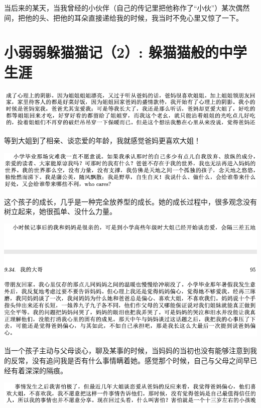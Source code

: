 \documentclass[9pt, b5paper]{article}
\begin{document}
当后来的某天，当我曾经的小伙伴（自己的传记里把他称作了“小伙”）某次偶然间，把他的头、把他的耳朵直接递给我的时候，我当时不免心里又惊了一下。

\section{小弱弱躲猫猫记（2）: 躲猫猫般的中学生涯}
\label{sec:orged57c9b}

\begin{center}
\includegraphics[width=.9\linewidth]{./pic/backups_plans_20210422_101254.png}
\end{center}

等到大姐到了相亲、谈恋爱的年龄，我就感觉爸妈更喜欢大姐！

\begin{center}
\includegraphics[width=.9\linewidth]{./pic/backups_plans_20210422_095031.png}
\end{center}

这个孩子的成长，几乎是一种完全放养型的成长。她的成长过程中，很多观念没有树立起来，她很孤单、没什么力量。 

\begin{center}
\includegraphics[width=.9\linewidth]{./pic/backups_plans_20210422_094911.png}
\end{center}

当一个孩子主动与父母谈心，聊及某事的时候，当妈妈的当初也没有能够注意到我的反常，没有追问我是否有什么事情瞒着她。感觉那个时候，自己与父母之间早已经有着深深的隔痕。

\begin{center}
\includegraphics[width=.9\linewidth]{./pic/backups_plans_20210422_101554.png}
\end{center}
\end{document}
